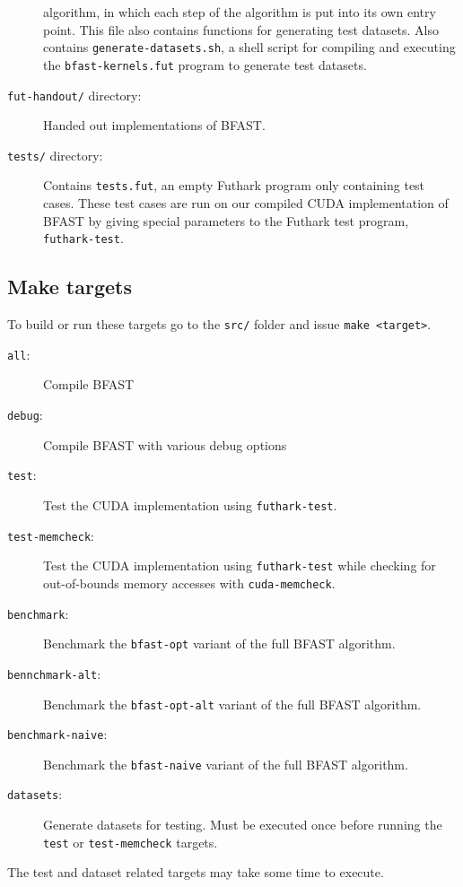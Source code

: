 \begin{description}
  algorithm, in which each step of the algorithm is put into its own entry
  point.
  This file also contains functions for generating test datasets.
  Also contains \texttt{generate-datasets.sh}, a shell script for compiling and
  executing the \texttt{bfast-kernels.fut} program to generate test datasets.
\item[\texttt{fut-handout/} directory:]
  Handed out implementations of BFAST.
\item[\texttt{tests/} directory:]
  Contains \texttt{tests.fut}, an empty Futhark program only containing test
  cases.
  These test cases are run on our compiled CUDA implementation of BFAST by
  giving special parameters to the Futhark test program, \texttt{futhark-test}.
\end{description}

\subsection{Make targets}

To build or run these targets go to the \texttt{src/} folder and issue \texttt{make
<target>}.
\begin{description}
\item[\texttt{all}:] Compile BFAST
\item[\texttt{debug}:] Compile BFAST with various debug options
\item[\texttt{test}:] Test the CUDA implementation using \texttt{futhark-test}.
\item[\texttt{test-memcheck}:]
Test the CUDA implementation using \texttt{futhark-test} while checking for
out-of-bounds memory accesses with \texttt{cuda-memcheck}.
\item[\texttt{benchmark}:]
Benchmark the \texttt{bfast-opt} variant of the full BFAST algorithm.
\item[\texttt{bennchmark-alt}:]
Benchmark the \texttt{bfast-opt-alt} variant of the full BFAST algorithm.
\item[\texttt{benchmark-naive}:]
Benchmark the \texttt{bfast-naive} variant of the full BFAST algorithm.
\item[\texttt{datasets}:]
Generate datasets for testing.
Must be executed once before running the \texttt{test} or
\texttt{test-memcheck} targets.
\end{description}

The test and dataset related targets may take some time to execute.


